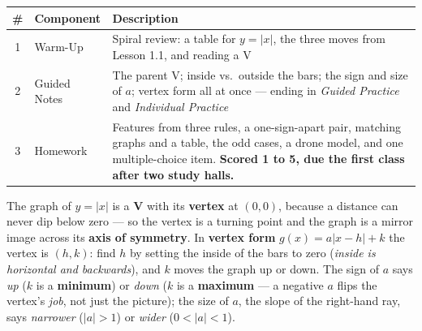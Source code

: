 \documentclass[10pt]{article}
\begin{document}
\begin{tocbox}
\small
\renewcommand{\arraystretch}{1.5}
\begin{tabularx}{\linewidth}{@{} c l X @{}}
\rowcolor{forestbg}
\textbf{\#} & \textbf{Component} & \textbf{Description} \\
\midrule
1 & Warm-Up        & Spiral review: a table for $y=|x|$, the three moves from Lesson 1.1, and
                     reading a V \\
2 & Guided Notes   & The parent V; inside vs.\ outside the bars; the sign and size of $a$;
                     vertex form all at once --- ending in \emph{Guided Practice} and
                     \emph{Individual Practice} \\
3 & Homework       & Features from three rules, a one-sign-apart pair, matching graphs and a
                     table, the odd cases, a drone model, and one multiple-choice item. \textbf{Scored 1 to 5, due the first class after two study halls.} \\
\end{tabularx}
\end{tocbox}

\vspace{0.10in}

\begin{remindbox}
\small The graph of $y=|x|$ is a \textbf{V} with its \textbf{vertex} at $(0,0)$, because a distance
can never dip below zero --- so the vertex is a turning point and the graph is a mirror image
across its \textbf{axis of symmetry}. In \textbf{vertex form} $g(x)=a|x-h|+k$ the vertex is
$(h,k)$: find $h$ by setting the inside of the bars to zero (\emph{inside is horizontal and
backwards}), and $k$ moves the graph up or down. The sign of $a$ says \emph{up} ($k$ is a
\textbf{minimum}) or \emph{down} ($k$ is a \textbf{maximum} --- a negative $a$ flips the vertex's
\emph{job}, not just the picture); the size of $a$, the slope of the right-hand ray, says
\emph{narrower} ($|a|>1$) or \emph{wider} ($0<|a|<1$).
\end{remindbox}
\end{document}
